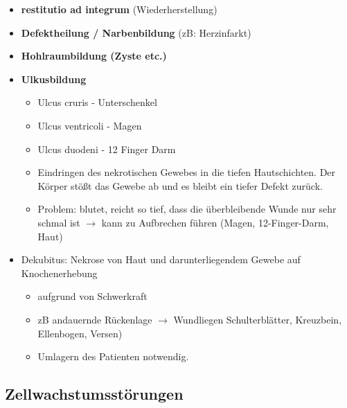 \begin{itemize}
\begin{itemize}
				\item \textbf{restitutio ad integrum} (Wiederherstellung)
				\item \textbf{Defektheilung / Narbenbildung} (zB: Herzinfarkt)
				\item \textbf{Hohlraumbildung (Zyste etc.)}
				\item \textbf{Ulkusbildung}
					\begin{itemize}
						\item Ulcus cruris - Unterschenkel
						\item Ulcus ventricoli - Magen
						\item Ulcus duodeni - 12 Finger Darm
						\item Eindringen des nekrotischen Gewebes in die tiefen Hautschichten. Der Körper stößt das Gewebe ab und es bleibt ein tiefer Defekt zurück.
						\item Problem: blutet, reicht so tief, dass die überbleibende Wunde nur sehr schmal ist $\rightarrow$ kann zu Aufbrechen führen (Magen, 12-Finger-Darm, Haut)
					\end{itemize}
				\item Dekubitus: Nekrose von Haut und darunterliegendem Gewebe auf Knochenerhebung
					\begin{itemize}
						\item aufgrund von Schwerkraft 
						\item zB andauernde Rückenlage $\rightarrow$ Wundliegen Schulterblätter, Kreuzbein, Ellenbogen, Versen)
						\item Umlagern des Patienten notwendig.
					\end{itemize}
			\end{itemize}
	\end{itemize}

\subsection{Zellwachstumsstörungen}
